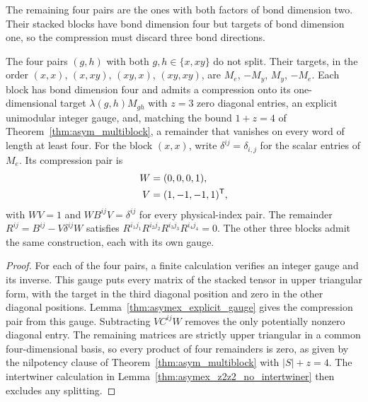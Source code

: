 The remaining four pairs are the ones with both factors of bond
dimension two. Their stacked blocks have bond dimension four but
targets of bond dimension one, so the compression must discard three
bond directions.

\begin{lemma}%
    \label{thm:asymex_z2z2_nonsplit}
    \leanok
    The four pairs $(g,h)$ with both $g,h\in\{x,xy\}$ do not split.
    Their targets, in the order $(x,x)$, $(x,xy)$, $(xy,x)$,
    $(xy,xy)$, are $M_e$, $-M_y$, $M_y$, $-M_e$.
    Each block has bond dimension four and admits a compression onto
    its one-dimensional target $\lambda(g,h)M_{gh}$ with $z=3$ zero
    diagonal entries, an explicit unimodular integer gauge, and, matching
    the bound $1+z=4$ of Theorem~\ref{thm:asym_multiblock}, a
    remainder that vanishes on every word of length at least four.
    For the block $(x,x)$, write
    $\delta^{ij}=\delta_{i,j}$ for the scalar entries of $M_e$.
    Its compression pair is
    \begin{align}
        W & =(0,0,0,1),
        \notag                        \\
        V & =(1,-1,-1,1)^{\mathsf T},
        \notag
    \end{align}
    with $WV=1$ and $WB^{ij}V=\delta^{ij}$ for every physical-index
    pair. The remainder $R^{ij}=B^{ij}-V\delta^{ij}W$ satisfies
    $R^{i_1j_1}R^{i_2j_2}R^{i_3j_3}R^{i_4j_4}=0$.
    The other three blocks admit the same construction, each with its
    own gauge.
\end{lemma}

\begin{proof}
    \leanok
    For each of the four pairs, a finite calculation verifies an
    integer gauge and its inverse. This gauge puts every matrix of
    the stacked tensor in upper triangular form, with the target
    in the third diagonal position and zero in the other diagonal
    positions.
    Lemma~\ref{thm:asymex_explicit_gauge} gives the compression pair
    from this gauge. Subtracting $VC^{ij}W$ removes the only
    potentially nonzero diagonal entry. The remaining matrices are
    strictly upper triangular in a common four-dimensional basis,
    so every product of four remainders is zero, as given by the
    nilpotency clause of Theorem~\ref{thm:asym_multiblock} with
    $|S|+z=4$. The intertwiner calculation in
    Lemma~\ref{thm:asymex_z2z2_no_intertwiner} then excludes any
    splitting.
\end{proof}


